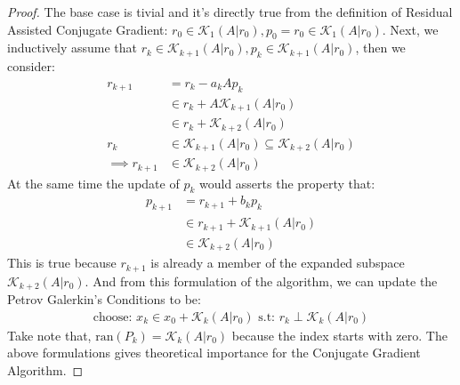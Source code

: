 \documentclass[]{article}
\theoremstyle{definition}
\begin{document}
            \begin{proof}
                The base case is tivial and it's directly true from the definition of Residual Assisted Conjugate Gradient: $r_0 \in \mathcal K_1(A|r_0), p_0 = r_0 \in \mathcal K_1(A|r_0)$. Next, we inductively assume that $r_k \in \mathcal K_{k + 1}(A|r_0), p_k \in \mathcal K_{k + 1}(A|r_0)$, then we consider: 
                \begin{align}
                    r_{k + 1} &= r_k - a_kAp_k
                    \\
                    &\in r_k + A\mathcal K_{k + 1}(A|r_0)
                    \\
                    &\in r_k + \mathcal K_{k + 2}(A|r_0)
                    \\
                    r_k 
                    &\in 
                    \mathcal K_{k + 1}(A|r_0) \subseteq \mathcal K_{k + 2}(A|r_0)
                    \\
                    \implies r_{k + 1}
                    &\in 
                    \mathcal K_{k + 2}(A|r_0)
                \end{align}
                At the same time the update of $p_k$ would asserts the property that: 
                \begin{align}
                    p_{k + 1} &= r_{k + 1} + b_kp_k
                    \\
                    &\in 
                    r_{k + 1} + \mathcal K_{k + 1}(A|r_0)
                    \\
                    &\in \mathcal K_{k + 2}(A|r_0)
                \end{align}
                This is true because $r_{k + 1}$ is already a member of the expanded subspace $\mathcal K_{k + 2}(A|r_0)$. And from this formulation of the algorithm, we can update the Petrov Galerkin's Conditions to be: 
                \begin{align}
                    \text{choose: } x_k\in x_0 + \mathcal K_{k}(A|r_0) \text{ s.t: } r_k \perp \mathcal K_{k}(A|r_0)
                \end{align}
                Take note that, $\text{ran}(P_k) = \mathcal K_k(A|r_0)$ because the index starts with zero. The above formulations gives theoretical importance for the Conjugate Gradient Algorithm. 
            \end{proof}
\end{document}
